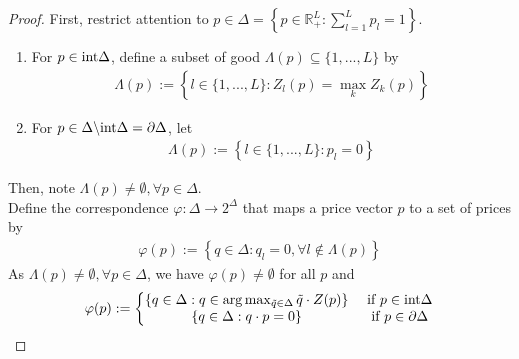 \documentclass[11pt]{elegantbook}
\begin{document}
\begin{proof}
    First, restrict attention to $p\in\Delta=\left\{p\in \mathbb{R}^L_+:\sum_{l=1}^Lp_l=1\right\}$.
    \begin{enumerate}[$\circ$]
        \item For $p\in \textnormal{int}\Delta$, define a subset of good $\Lambda(p)\subseteq \{1,...,L\}$ by
        \begin{equation}
            \begin{aligned}
                \Lambda(p):=\left\{l\in \{1,...,L\}: Z_l(p)=\max_k Z_k(p)\right\}
            \end{aligned}
            \nonumber
        \end{equation}
        \item For $p\in \Delta\backslash\textnormal{int}\Delta=\partial \Delta$, let
        \begin{equation}
            \begin{aligned}
                \Lambda(p):=\left\{l\in \{1,...,L\}: p_l=0\right\}
            \end{aligned}
            \nonumber
        \end{equation}
    \end{enumerate}
    Then, note $\Lambda(p)\neq\emptyset, \forall p\in\Delta$.\\
    Define the correspondence $\varphi: \Delta \rightarrow 2^\Delta$ that maps a price vector $p$ to a set of prices by
    \begin{equation}
        \begin{aligned}
            \varphi(p):=\left\{q\in \Delta:q_l=0, \forall l\notin \Lambda(p)\right\}
        \end{aligned}
        \nonumber
    \end{equation}
    As $\Lambda(p)\neq\emptyset, \forall p\in\Delta$, we have $\varphi(p)\neq \emptyset$ for all $p$ and
    \begin{equation}
        \begin{aligned}
            \varphi(p):=\left\{\begin{matrix}
                \left\{q\in \Delta:q\in\arg\max_{\tilde{q}\in\Delta}\tilde{q}\cdot Z(p) \right\}& \textnormal{ if }p\in \textnormal{int}\Delta\\
                \{q\in\Delta:q\cdot p=0\}&\textnormal{ if }p\in \partial\Delta
            \end{matrix}\right.
        \end{aligned}
        \nonumber
    \end{equation}

\end{proof}
\end{document}
